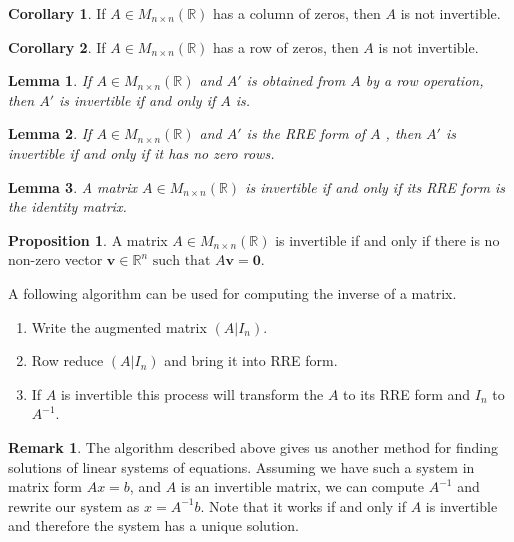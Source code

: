 \documentclass[11pt,a4paper]{article}
\newcommand\R{\mathbb{R}}
\newcommand\st{\text{ such that }}
\newcommand\inMatrixSq{\in M_{n \times n} (\R)}
\newtheorem{lemma}{Lemma}
\theoremstyle{definition}
\newtheorem{proposition}{Proposition}
\newtheorem{corollary}{Corollary}
\newtheorem{remark}{Remark}
\begin{document}
\begin{corollary}
    If $ A \inMatrixSq $ has a column of zeros, then $ A $ is not invertible.
\end{corollary}

\begin{corollary}
    If $ A \inMatrixSq $ has a row of zeros, then $ A $ is not invertible.
\end{corollary}

\begin{lemma}
    If $ A \inMatrixSq $ and $ A' $ is obtained from $ A $ by a row operation, then $ A' $ is invertible if and only if $ A $ is.
\end{lemma}

\begin{lemma}
    If $ A \inMatrixSq $ and $ A' $ is the RRE form of $ A $ , then $ A' $ is invertible if and only if it has no zero rows.
\end{lemma}

\begin{lemma}
    A matrix $ A \inMatrixSq $  is invertible if and only if its RRE form is the identity matrix.
\end{lemma}

\begin{proposition}
    A matrix $ A \inMatrixSq $ is invertible if and only if there is no non-zero vector $ \mathbf{v} \in \R^n \st A\mathbf{v} = \mathbf{0} $.
\end{proposition}

A following algorithm can be used for computing the inverse of a matrix.
\begin{enumerate}
    \item Write the augmented matrix $ (A|I_n) $.
    \item Row reduce $ (A|I_n) $ and bring it into RRE form.
    \item If $A$ is invertible this process will transform the $A$ to its RRE form and $I_n$ to $A^{-1}$.
\end{enumerate}

\begin{remark}
    The algorithm described above gives us another method for finding solutions of linear systems of equations. Assuming we have such a system in matrix form $ Ax = b $,
    and $A$ is an invertible matrix, we can compute $A^{-1}$ and rewrite our system as $ x = A^{-1}b$. Note that it works if and only if $A$ is invertible
    and therefore the system has a unique solution.
\end{remark}
\end{document}
